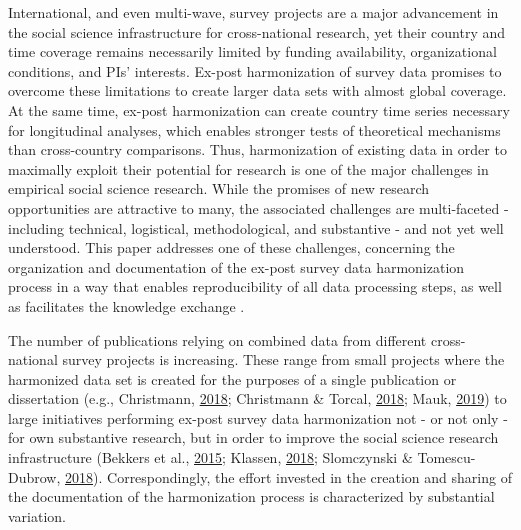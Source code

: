 \documentclass[12pt,]{article}
\begin{document}
International, and even multi-wave, survey projects are a major advancement in the social science infrastructure for cross-national research, yet their country and time coverage remains necessarily limited by funding availability, organizational conditions, and PIs' interests. Ex-post harmonization of survey data promises to overcome these limitations to create larger data sets with almost global coverage. At the same time, ex-post harmonization can create country time series necessary for longitudinal analyses, which enables stronger tests of theoretical mechanisms than cross-country comparisons. Thus, harmonization of existing data in order to maximally exploit their potential for research is one of the major challenges in empirical social science research. While the promises of new research opportunities are attractive to many, the associated challenges are multi-faceted - including technical, logistical, methodological, and substantive - and not yet well understood. This paper addresses one of these challenges, concerning the organization and documentation of the ex-post survey data harmonization process in a way that enables reproducibility of all data processing steps, as well as facilitates the knowledge exchange .

The number of publications relying on combined data from different cross-national survey projects is increasing. These range from small projects where the harmonized data set is created for the purposes of a single publication or dissertation (e.g., Christmann, \protect\hyperlink{ref-Christmann2018}{2018}; Christmann \& Torcal, \protect\hyperlink{ref-Christmann2018a}{2018}; Mauk, \protect\hyperlink{ref-Mauk2019}{2019}) to large initiatives performing ex-post survey data harmonization not - or not only - for own substantive research, but in order to improve the social science research infrastructure (Bekkers et al., \protect\hyperlink{ref-Bekkers2015}{2015}; Klassen, \protect\hyperlink{ref-Klassen2018}{2018}; Slomczynski \& Tomescu-Dubrow, \protect\hyperlink{ref-Slomczynski2018}{2018}). Correspondingly, the effort invested in the creation and sharing of the documentation of the harmonization process is characterized by substantial variation.
\end{document}
